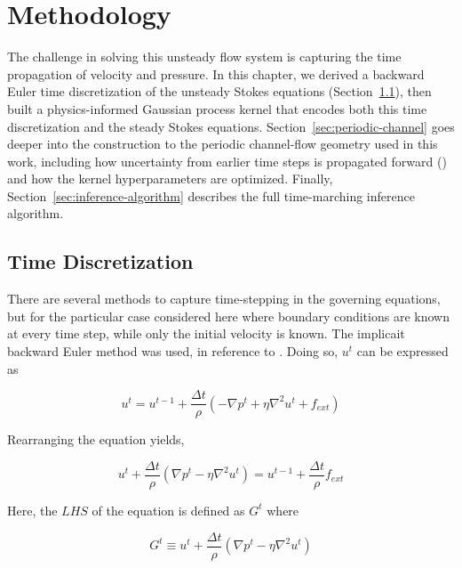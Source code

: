 \documentclass[11pt, a4paper]{report}
\begin{document}
\chapter{Methodology}%
\label{ch:methodology}

The challenge in solving this unsteady flow system is capturing the time propagation of velocity and pressure. 
In this chapter, we derived a backward Euler time discretization of the unsteady Stokes equations (Section~\ref{sec:time-disc}), 
then built a physics-informed Gaussian process kernel that encodes both this time discretization and the steady Stokes equations. 
Section~\ref{sec:periodic-channel} goes deeper into the construction to the periodic channel-flow geometry used in this work, including
how uncertainty from earlier time steps is propagated forward (\textcite{Raissi2018}) and how the kernel hyperparameters are optimized. 
Finally, Section~\ref{sec:inference-algorithm} describes the full time-marching inference algorithm.

\section{Time Discretization}%
\label{sec:time-disc}

There are several methods to capture time-stepping in the governing equations, but for the particular case considered here
where boundary conditions are known at every time step, while only the initial velocity is known. The implicait backward Euler
method was used, in reference to \textcite{Raissi2018}. Doing so, \(u^t\) can be expressed as

\begin{equation}
    u^t = u^{t-1} + \frac{\Delta t}{\rho} \left({-\nabla p^t +  \eta{\nabla}^{2} u^t + f_{ext}}\right)
\end{equation}

\noindent Rearranging the equation yields, 

\begin{equation}
    u^t + \frac{\Delta t}{\rho} \left({\nabla p^t -  \eta{\nabla}^{2} u^t}\right)  = u^{t-1} + \frac{\Delta t}{\rho}f_{ext}
\end{equation}

\noindent Here, the \(LHS\) of the equation is defined as \({G^{t}}\) where

\begin{equation}
    {G^{t}} \equiv u^t + \frac{\Delta t}{\rho} \left({\nabla p^t -  \eta{\nabla}^{2} u^t}\right)
    \label{eq:governing-eq}
\end{equation}
\end{document}
